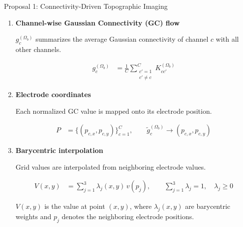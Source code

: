 \documentclass[aspectratio=169]{beamer}
\let\oldcite\cite
\renewcommand{\cite}[1]{{\tiny\oldcite{#1}}}
\begin{document}

\begin{frame}{Proposal 1: Connectivity-Driven Topographic Imaging}
\scriptsize
\setlength{\abovedisplayskip}{2pt}
\setlength{\belowdisplayskip}{2pt}
\setlength{\jot}{1pt}

\begin{enumerate}
    \setlength{\itemsep}{0.08cm}

    \item \textbf{Channel-wise Gaussian Connectivity (GC) flow}
    {\scriptsize \cite{garciamurillo2023kcsfcnet}}

    $g_c^{(\Omega_b)}$ summarizes the average Gaussian connectivity of channel $c$ with all other channels.

    \begin{align*}
    g_c^{(\Omega_b)}
    &=
    \frac{1}{C}
    \sum_{\substack{c'=1 \\ c'\neq c}}^{C}
    K_{cc'}^{(\Omega_b)}
    \end{align*}

    \item \textbf{Electrode coordinates}
    {\scriptsize \cite{jasper1958ten}}

    Each normalized GC value is mapped onto its electrode position.

    \begin{align*}
    P
    &=
    \{(p_{c,x},p_{c,y})\}_{c=1}^{C},
    \qquad
    \tilde{g}_c^{(\Omega_b)}
    \rightarrow
    (p_{c,x},p_{c,y})
    \end{align*}

    \item \textbf{Barycentric interpolation}
    {\scriptsize \cite{bashivan2015learning}}

    Grid values are interpolated from neighboring electrode values.

    \begin{align*}
    V(x,y)
    &=
    \sum_{j=1}^{3}
    \lambda_j(x,y)\,v(p_j),
    \qquad
    \sum_{j=1}^{3}\lambda_j
    =
    1,
    \quad
    \lambda_j \geq 0
    \end{align*}


{\scriptsize
$V(x,y)$ is the value at point $(x,y)$, where $\lambda_j(x,y)$ are barycentric weights and $p_j$ denotes the neighboring electrode positions.
}


\end{enumerate}

\end{frame}
\end{document}

